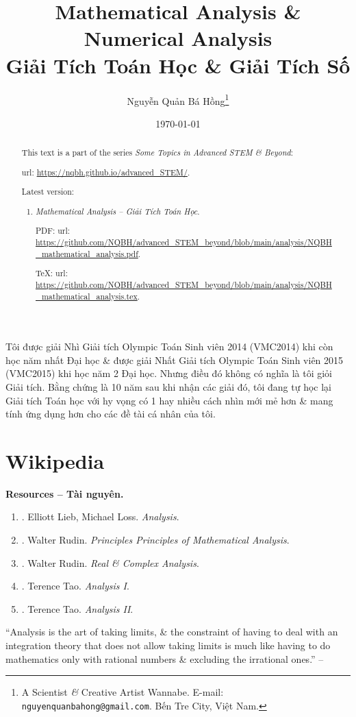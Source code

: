 \documentclass{article}
\title{Mathematical Analysis \& Numerical Analysis\\Giải Tích Toán Học \& Giải Tích Số}
\author{Nguyễn Quản Bá Hồng\footnote{A Scientist {\it\&} Creative Artist Wannabe. E-mail: {\tt nguyenquanbahong@gmail.com}. Bến Tre City, Việt Nam.}}
\date{\today}
\begin{document}
\maketitle
\begin{abstract}
	This text is a part of the series {\it Some Topics in Advanced STEM \& Beyond}:
	
	{\sc url}: \url{https://nqbh.github.io/advanced_STEM/}.
	
	Latest version:
	\begin{enumerate}
		\item {\it Mathematical Analysis -- Giải Tích Toán Học}.
		
		PDF: {\sc url}: \url{https://github.com/NQBH/advanced_STEM_beyond/blob/main/analysis/NQBH_mathematical_analysis.pdf}.
		
		\TeX: {\sc url}: \url{https://github.com/NQBH/advanced_STEM_beyond/blob/main/analysis/NQBH_mathematical_analysis.tex}.
	\end{enumerate}
\end{abstract}
\tableofcontents


Tôi được giải Nhì Giải tích Olympic Toán Sinh viên 2014 (VMC2014) khi còn học năm nhất Đại học \& được giải Nhất Giải tích Olympic Toán Sinh viên 2015 (VMC2015) khi học năm 2 Đại học. Nhưng điều đó không có nghĩa là tôi giỏi Giải tích. Bằng chứng là 10 năm sau khi nhận các giải đó, tôi đang tự học lại Giải tích Toán học với hy vọng có 1 hay nhiều cách nhìn mới mẻ hơn \& mang tính ứng dụng hơn cho các đề tài cá nhân của tôi.

\section{Wikipedia}
\textbf{\textsf{Resources -- Tài nguyên.}}
\begin{enumerate}
	\item \cite{Lieb_Loss2001}. {\sc Elliott Lieb, Michael Loss}. {\it Analysis}.
	\item \cite{Rudin1976}. {\sc Walter Rudin}. {\it Principles Principles of Mathematical Analysis}.
	\item \cite{Rudin1973,Rudin1987}. {\sc Walter Rudin}. {\it Real \& Complex Analysis}.
	\item \cite{Tao_analysis_1}. {\sc Terence Tao}. {\it Analysis I}.
	\item \cite{Tao_analysis_2}. {\sc Terence Tao}. {\it Analysis II}.
\end{enumerate}
``Analysis is the art of taking limits, \& the constraint of having to deal with an integration theory that does not allow taking limits is much like having to do mathematics only with rational numbers \& excluding the irrational ones.'' -- \cite[Chap. 1, p. 1]{Lieb_Loss2001}
\end{document}
